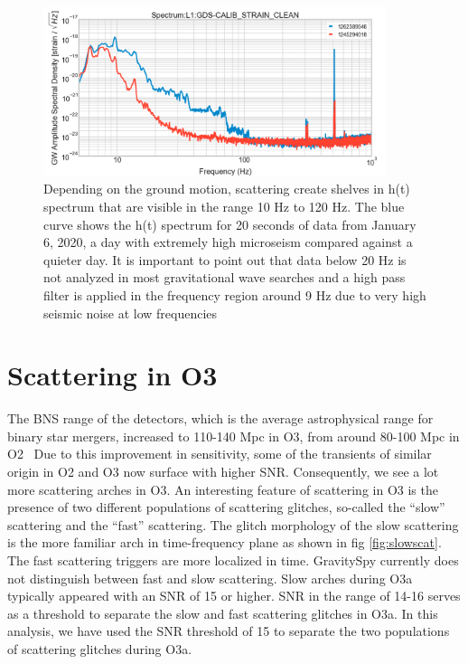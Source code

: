 \documentclass[12pt]{iopart}
\begin{document}
\begin{figure}[h]
    \centering
    \includegraphics[width=10cm]{scat_shelf6.png}
    \caption{ Depending on the ground motion, scattering create shelves in h(t) spectrum that are visible in the range 10 Hz to 120 Hz. The blue curve shows the h(t) spectrum for 20 seconds of data from January 6, 2020, a day with extremely high microseism compared against a quieter day. It is important to point out that data below 20 Hz is not analyzed in most gravitational wave searches and a high pass filter is applied in the frequency region around 9 Hz due to very high seismic noise at low frequencies \cite{viets_thesis}}
    \label{fig:scatshelf1}
\end{figure}
\section{Scattering in O3}\label{scatino3}
The BNS range of the detectors, which is the average astrophysical range for binary star mergers, increased to 110-140 Mpc in O3, from around 80-100 Mpc in O2~\cite{prospect} Due to this improvement in sensitivity, some of the transients of similar origin in O2 and O3 now surface with higher SNR. 
Consequently, we see a lot more scattering arches in O3. An interesting feature of scattering in O3 is the presence of two different populations of scattering glitches, so-called the ``slow'' scattering and the ``fast'' scattering. The glitch morphology of the slow scattering is the more familiar arch in time-frequency plane as shown in fig \ref{fig:slowscat}. The fast scattering triggers are more localized in time. GravitySpy currently does not distinguish between fast and slow scattering. Slow arches during O3a  typically appeared with an SNR of 15 or higher. SNR in the range of 14-16 serves as a threshold to separate the slow and fast scattering glitches in O3a. In this analysis, we have used the SNR threshold of 15 to separate the two populations of scattering glitches during O3a.
\end{document}
